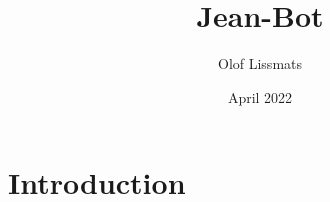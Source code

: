 \documentclass{article}
\title{Jean-Bot}
\author{Olof Lissmats}
\date{April 2022}
\begin{document}
\maketitle

\section{Introduction}
\end{document}
